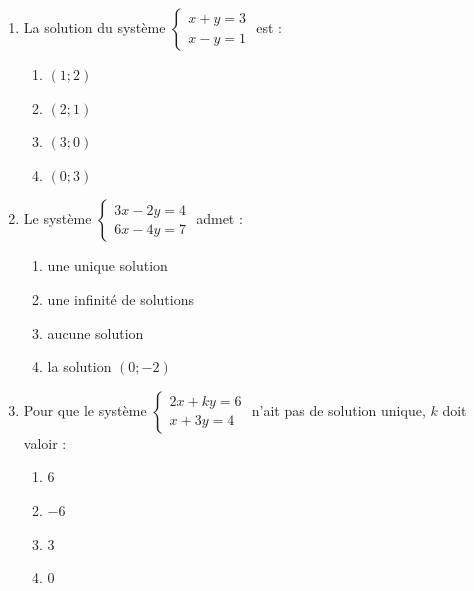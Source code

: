 \documentclass[11pt]{article}
\begin{document}
\begin{exercice}
\begin{enumerate}
    \item La solution du système $\left\{\begin{array}{l} x + y = 3 \\ x - y = 1 \end{array}\right.$ est :
    \begin{enumerate}
        \item $(1; 2)$
        \item $(2; 1)$
        \item $(3; 0)$
        \item $(0; 3)$
    \end{enumerate}
    \item Le système $\left\{\begin{array}{l} 3x - 2y = 4 \\ 6x - 4y = 7 \end{array}\right.$ admet :
    \begin{enumerate}
        \item une unique solution
        \item une infinité de solutions
        \item aucune solution
        \item la solution $(0; -2)$
    \end{enumerate}
    \item Pour que le système $\left\{\begin{array}{l} 2x + ky = 6 \\ x + 3y = 4 \end{array}\right.$ n'ait pas de solution unique, $k$ doit valoir :
    \begin{enumerate}
        \item $6$
        \item $-6$
        \item $3$
        \item $0$
    \end{enumerate}
\end{enumerate}
\end{exercice}
\end{document}
